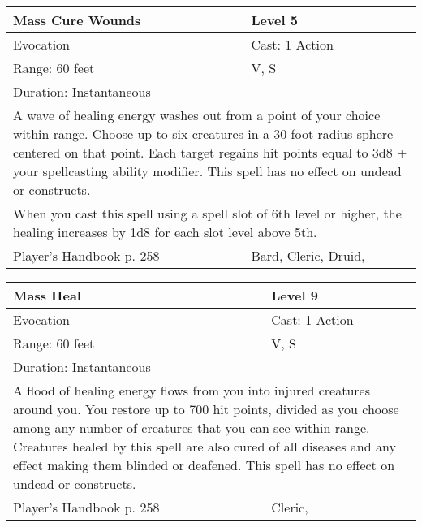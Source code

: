 \documentclass[11pt]{report}
\begin{document}
\begin{table}[H]
	\begin{tabular}{||p{6cm}|p{6cm}||}
		\hline\hline
		\bf{Mass Cure Wounds} & Level 5\\ \hline
		Evocation & Cast: 1 Action\\ \hline
		Range: 60 feet & V, S\\ \hline
		Duration: Instantaneous & \\ \hline
		\multicolumn{2}{||p{12cm}||}{A wave of healing energy washes out from a point of your choice within range.
Choose up to six creatures in a 30-foot-radius sphere centered on that point. Each target regains hit points equal to 3d8 + your spellcasting ability modifier. This spell has no effect on undead or constructs.}\\ \hline
		\multicolumn{2}{||p{12cm}||}{When you cast this spell using a spell slot of 6th level or higher, the healing increases by 1d8 for each slot level above 5th.}\\ \hline
Player's Handbook p. 258 & Bard, Cleric, Druid, \\ \hline\hline
	\end{tabular}
\end{table}

\begin{table}[H]
	\begin{tabular}{||p{6cm}|p{6cm}||}
		\hline\hline
		\bf{Mass Heal} & Level 9\\ \hline
		Evocation & Cast: 1 Action\\ \hline
		Range: 60 feet & V, S\\ \hline
		Duration: Instantaneous & \\ \hline
		\multicolumn{2}{||p{12cm}||}{A flood of healing energy flows from you into injured creatures around you. You restore up to 700 hit points, divided as you choose among any number of creatures that you can see within range. Creatures healed by this spell are also cured of all diseases and any effect making them blinded or deafened. This spell has no effect on undead or constructs.}\\ \hline
Player's Handbook p. 258 & Cleric, \\ \hline\hline
	\end{tabular}
\end{table}
\end{document}
